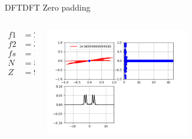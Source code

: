 \begin{frame}[c]{DFT}{DFT Zero padding}
   \handsonicon
   \begin{columns}[t]
      \begin{column}[t]{.2\textwidth}
         \begin{align*}
            f1 &= 2\\
            f2 &= 3\\
            fs &= 10\\
            N  &= 50\\
            Z  &= 950
         \end{align*}
      \end{column}
      \begin{column}[t]{.8\textwidth}
         \center\includegraphics[width=0.55\textwidth]{3_clase/zero_padding}
      \end{column}
   \end{columns}
   \vfill
\end{frame}
